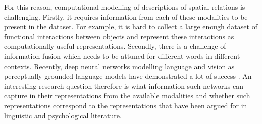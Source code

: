 For this reason, computational modelling of descriptions of spatial
relations is challenging. Firstly, it requires information from each
of these modalities to be present in the dataset. For example, it is
hard to collect a large enough dataset of functional interactions
between objects and represent these interactions as computationally useful
representations. Secondly, there is a challenge of information fusion
which needs to be attuned for different words in different
contexts. Recently, deep neural networks modelling language and vision
as perceptually grounded language models have demonstrated a lot of
success \cite{Xu:2015aa,Lu:2016ab}. An interesting research question
therefore is what information such networks can capture in their
representations from the available modalities and whether such
representations correspond to the representations that have been
argued for in linguistic and psychological literature.

